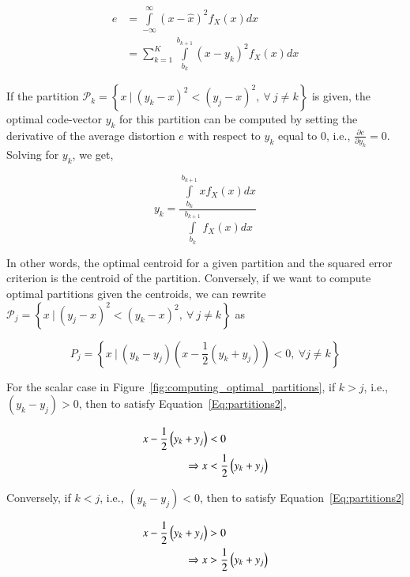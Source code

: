 \begin{equation}
\begin{array}{ll}
e 	&= \int\limits_{-\infty}^\infty(x - \hat{x})^2f_X(x)dx\\
	&=\sum\limits_{k=1}^K \int\limits_{b_k}^{b_{k+1}}(x-y_k)^2f_X(x)dx
\end{array}
\end{equation}

If the partition $\mathcal{P}_k = \left\{x \ | \ (y_k-x)^2 < (y_j-x)^2, \ \forall \ j \neq k \right\}$ is given, the optimal code-vector $y_k$ for this partition can be computed by setting the derivative of the average distortion $e$ with respect to $y_k$ equal to 0, i.e., $\frac{\partial{e}}{\partial{y_k}} = 0$.  Solving for $y_k$, we get,

\begin{equation}
y_k = \frac
{\int\limits_{b_k}^{b_{k+1}}xf_X(x)dx}
{\int\limits_{b_k}^{b_{k+1}}f_X(x)dx}
\end{equation}

In other words, the optimal centroid for a given partition and the squared error criterion is the centroid of the partition.  Conversely, if we want to compute optimal partitions given the centroids, we can rewrite $\mathcal{P}_j= \left\{x \ | \ (y_j-x)^2 < (y_k-x)^2, \ \forall \ j \neq k \right\}$ as 

\begin{equation}
\label{Eq:partitions2}
P_j=\left\{x \ | \ (y_k -y_j) \left(x - \frac{1}{2} \left(y_k + y_j \right)\right) < 0, \ \forall j \neq k 
\right\}
\end{equation}

For the scalar case in Figure~\ref{fig:computing_optimal_partitions}, if $k>j$, i.e., $(y_k -y_j) > 0$, then to satisfy Equation~\ref{Eq:partitions2},

\begin{align}
\label{Eq:partitions3}
x - \frac{1}{2} \left(y_k + y_j \right) &< 0\notag\\
\Rightarrow x &< \frac{1}{2} \left(y_k + y_j \right)
\end{align}

Conversely, if $k<j$, i.e., $(y_k -y_j) < 0$, then to satisfy Equation~\ref{Eq:partitions2}

\begin{align}
\label{Eq:partitions4}
x - \frac{1}{2} \left(y_k + y_j \right) &> 0 \notag\\
\Rightarrow x &> \frac{1}{2} \left(y_k + y_j \right)
\end{align}

